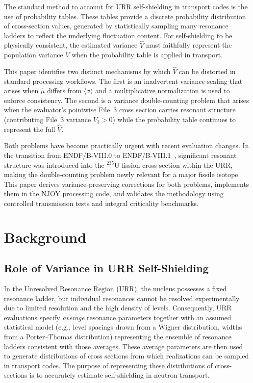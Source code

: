 \documentclass{style/nseJournal}
\newcommand{\isotope}[2]{\ensuremath{^{#1}\mathrm{#2}}}
\newcommand{\sbin}{\langle \sigma \rangle}
\begin{document}
The standard method to account for URR self-shielding in transport codes is the use of probability tables. These tables provide a discrete probability distribution of cross-section values, generated by statistically sampling many resonance ladders to reflect the underlying fluctuation content. For self-shielding to be physically consistent, the estimated variance $\hat{V}$ must faithfully represent the population variance $V$ when the probability table is applied in transport.

This paper identifies two distinct mechanisms by which $\hat{V}$ can be distorted in standard processing workflows. The first is an inadvertent variance scaling that arises when $\hat{\mu}$ differs from $\sbin$ and a multiplicative normalization is used to enforce consistency. The second is a variance double-counting problem that arises when the evaluator's pointwise File~3 cross section carries resonant structure (contributing File~3 variance $V_3 > 0$) while the probability table continues to represent the full $\hat{V}$.

Both problems have become practically urgent with recent evaluation changes. In the transition from ENDF/B-VIII.0 to ENDF/B-VIII.1~\cite{endf-8.0,endf-8.1}, significant resonant structure was introduced into the \isotope{235}{U} fission cross section within the URR, making the double-counting problem newly relevant for a major fissile isotope. This paper derives variance-preserving corrections for both problems, implements them in the NJOY processing code, and validates the methodology using controlled transmission tests and integral criticality benchmarks.

\section{Background}
\label{sec:background}

\subsection{Role of Variance in URR Self-Shielding}
\label{ssec:variance-role}
In the Unresolved Resonance Region (URR), the nucleus possesses a fixed resonance ladder, but individual resonances cannot be resolved experimentally due to limited resolution and the high density of levels. Consequently, URR evaluations specify \emph{average} resonance parameters together with an assumed statistical model (e.g., level spacings drawn from a Wigner distribution, widths from a Porter--Thomas distribution) representing the ensemble of resonance ladders consistent with those averages. These average parameters are then used to generate distributions of cross sections from which realizations can be sampled in transport codes. The purpose of representing these distributions of cross-sections is to accurately estimate self-shielding in neutron transport.
\end{document}
